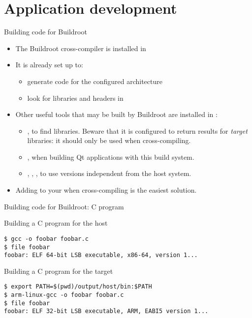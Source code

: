
\section{Application development}

\begin{frame}{Building code for Buildroot}
  \begin{itemize}
  \item The Buildroot cross-compiler is installed in
  \item It is already set up to:
    \begin{itemize}
    \item generate code for the configured architecture
    \item look for libraries and headers in 
    \end{itemize}
  \item Other useful tools that may be built by Buildroot are
    installed in :
    \begin{itemize}
    \item {}, to find libraries. Beware that it is
      configured to return results for {\em target} libraries: it
      should only be used when cross-compiling.
    \item {}, when building Qt applications with this build
      system.
    \item {}, , , to use
      versions independent from the host system.
    \end{itemize}
  \item Adding  to your  when
    cross-compiling is the easiest solution.
  \end{itemize}
\end{frame}

\begin{frame}[fragile]{Building code for Buildroot: C program}

\begin{block}{Building a C program for the host}
{\small
  \begin{verbatim}
$ gcc -o foobar foobar.c
$ file foobar
foobar: ELF 64-bit LSB executable, x86-64, version 1...
\end{verbatim}}
\end{block}

\begin{block}{Building a C program for the target}
{\small
  \begin{verbatim}
$ export PATH=$(pwd)/output/host/bin:$PATH
$ arm-linux-gcc -o foobar foobar.c
$ file foobar
foobar: ELF 32-bit LSB executable, ARM, EABI5 version 1...
\end{verbatim}}
\end{block}

\end{frame}

